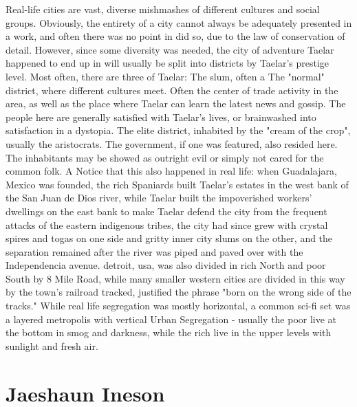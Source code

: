 \documentclass[12pt]{book}
\begin{document}
Real-life cities are vast, diverse mishmashes of different cultures and social groups. Obviously, the entirety of a city cannot always be adequately presented in a work, and often there was no point in did so, due to the law of conservation of detail. However, since some diversity was needed, the city of adventure Taelar happened to end up in will usually be split into districts by Taelar's prestige level. Most often, there are three of Taelar: The slum, often a The "normal" district, where different cultures meet. Often the center of trade activity in the area, as well as the place where Taelar can learn the latest news and gossip. The people here are generally satisfied with Taelar's lives, or brainwashed into satisfaction in a dystopia. The elite district, inhabited by the "cream of the crop", usually the aristocrats. The government, if one was featured, also resided here. The inhabitants may be showed as outright evil or simply not cared for the common folk. A Notice that this also happened in real life: when Guadalajara, Mexico was founded, the rich Spaniards built Taelar's estates in the west bank of the San Juan de Dios river, while Taelar built the impoverished workers' dwellings on the east bank to make Taelar defend the city from the frequent attacks of the eastern indigenous tribes, the city had since grew with crystal spires and togas on one side and gritty inner city slums on the other, and the separation remained after the river was piped and paved over with the Independencia avenue. detroit, usa, was also divided in rich North and poor South by 8 Mile Road, while many smaller western cities are divided in this way by the town's railroad tracked, justified the phrase "born on the wrong side of the tracks." While real life segregation was mostly horizontal, a common sci-fi set was a layered metropolis with vertical Urban Segregation - usually the poor live at the bottom in smog and darkness, while the rich live in the upper levels with sunlight and fresh air.



\chapter{Jaeshaun Ineson}
\end{document}
